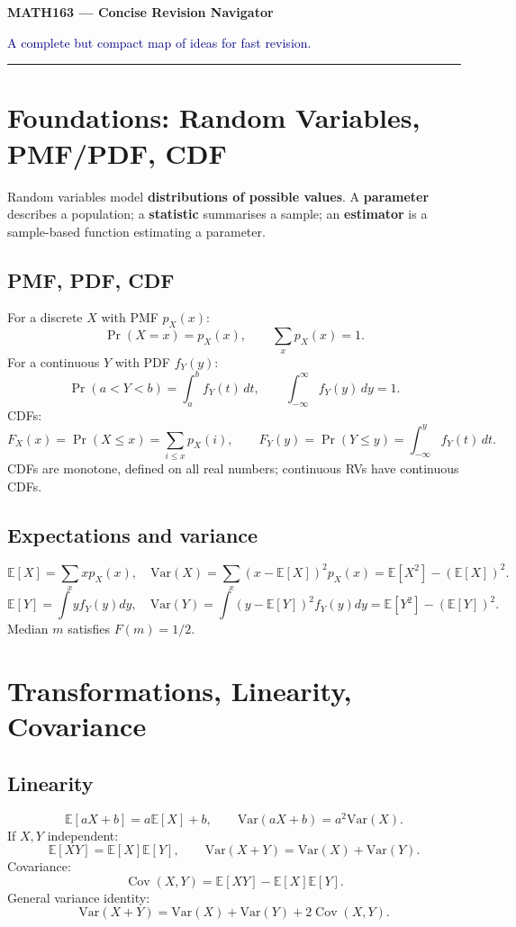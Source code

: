 \documentclass[11pt]{article}
\begin{document}
{\LARGE\bfseries MATH163 — Concise Revision Navigator}\par
{\large \textcolor{Navy}{A complete but compact map of ideas for fast revision.}}
\vspace{0.7em}
\hrule
\vspace{1em}

\section{Foundations: Random Variables, PMF/PDF, CDF}

\begin{keybox}
Random variables model \textbf{distributions of possible values}. A \textbf{parameter} describes a population; a \textbf{statistic} summarises a sample; an \textbf{estimator} is a sample-based function estimating a parameter.
\end{keybox}

\subsection*{PMF, PDF, CDF}
For a discrete $X$ with PMF $p_X(x)$:
\[
\Pr(X=x)=p_X(x), \qquad \sum_x p_X(x)=1.
\]
For a continuous $Y$ with PDF $f_Y(y)$:
\[
\Pr(a<Y<b)=\int_a^b f_Y(t)\,dt, \qquad \int_{-\infty}^{\infty} f_Y(y)\,dy=1.
\]
CDFs:
\[
F_X(x)=\Pr(X\le x)=\sum_{i\le x} p_X(i),
\qquad
F_Y(y)=\Pr(Y\le y)=\int_{-\infty}^y f_Y(t)\,dt.
\]
CDFs are monotone, defined on all real numbers; continuous RVs have continuous CDFs.

\subsection*{Expectations and variance}
\[
\mathbb E[X]=\sum_x x p_X(x),
\quad
\mathrm{Var}(X)=\sum_x (x-\mathbb E[X])^2p_X(x)=\mathbb E[X^2]-\left(\mathbb E[X]\right)^2.
\]
\[
\mathbb E[Y]=\int y f_Y(y)dy,
\quad
\mathrm{Var}(Y)=\int (y-\mathbb E[Y])^2 f_Y(y)dy=\mathbb E[Y^2]-\left(\mathbb E[Y]\right)^2.
\]
Median $m$ satisfies $F(m)=1/2$.

\section{Transformations, Linearity, Covariance}

\subsection*{Linearity}
\[
\mathbb E[aX+b]=a\mathbb E[X]+b,
\qquad
\mathrm{Var}(aX+b)=a^2\mathrm{Var}(X).
\]
If $X,Y$ independent:
\[
\mathbb E[XY]=\mathbb E[X]\mathbb E[Y],
\qquad
\mathrm{Var}(X+Y)=\mathrm{Var}(X)+\mathrm{Var}(Y).
\]
Covariance:
\[
\operatorname{Cov}(X,Y)=\mathbb E[XY]-\mathbb E[X]\mathbb E[Y].
\]
General variance identity:
\[
\mathrm{Var}(X+Y)=\mathrm{Var}(X)+\mathrm{Var}(Y)+2\operatorname{Cov}(X,Y).
\]
\end{document}
